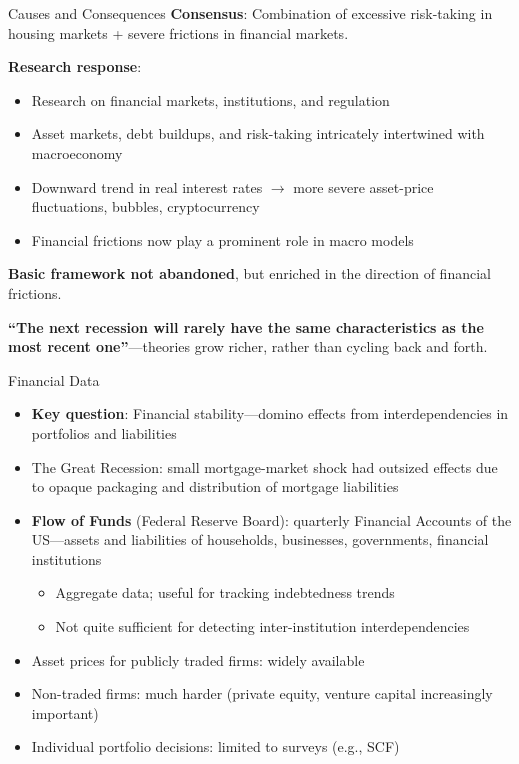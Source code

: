 \documentclass[blue]{beamer}
\begin{document}
\begin{frame}{Causes and Consequences}
	\textbf{Consensus}: Combination of excessive risk-taking in housing markets + severe frictions in financial markets.
	
	\textbf{Research response}:
		\vspace{-6pt}
	\begin{itemize}
		\item Research on financial markets, institutions, and regulation
		\item Asset markets, debt buildups, and risk-taking intricately intertwined with macroeconomy
		\item Downward trend in real interest rates $\to$ more severe asset-price fluctuations, bubbles, cryptocurrency
		\item Financial frictions now play a prominent role in macro models
	\end{itemize}
	

	\textbf{Basic framework not abandoned}, but enriched in the direction of financial frictions.
	

	\textbf{``The next recession will rarely have the same characteristics as the most recent one''}---theories grow richer, rather than cycling back and forth.
\end{frame}

\begin{frame}{Financial Data}
	\begin{itemize}
		\item \textbf{Key question}: Financial stability---domino effects from interdependencies in portfolios and liabilities
		\item The Great Recession: small mortgage-market shock had outsized effects due to opaque packaging and distribution of mortgage liabilities
		\item \textbf{Flow of Funds} (Federal Reserve Board): quarterly Financial Accounts of the US---assets and liabilities of households, businesses, governments, financial institutions
		\begin{itemize}
			\item Aggregate data; useful for tracking indebtedness trends
			\item Not quite sufficient for detecting inter-institution interdependencies
		\end{itemize}
		\item Asset prices for publicly traded firms: widely available
		\item Non-traded firms: much harder (private equity, venture capital increasingly important)
		\item Individual portfolio decisions: limited to surveys (e.g., SCF)
	\end{itemize}
\end{frame}
\end{document}
